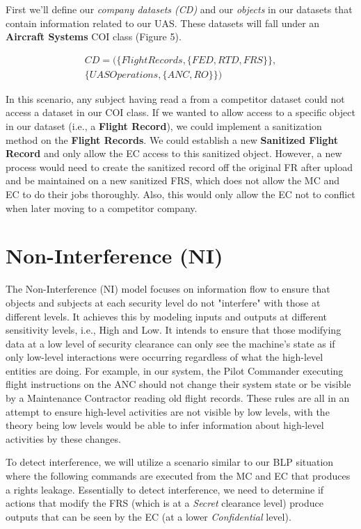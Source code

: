 \documentclass[10pt,journal,compsoc]{IEEEtran}
\begin{document}
First we'll define our \textit{company datasets (CD)} and our \textit{objects} in our datasets that contain information related to our UAS. These datasets will fall under an \textbf{Aircraft Systems} COI class (Figure 5).

\begin{equation*}
  \begin{aligned}
    CD = (\{Flight Records, \{FED, RTD, FRS\}\},\\
         \{UAS Operations, \{ANC, RO\}\})
  \end{aligned}
\end{equation*}

In this scenario, any subject having read a from a competitor dataset could not access a dataset in our COI class. If we wanted to allow access to a specific object in our dataset (i.e., a \textbf{Flight Record}), we could implement a sanitization method on the \textbf{Flight Records}. We could establish a new \textbf{Sanitized Flight Record} and only allow the EC access to this sanitized object. However, a new process would need to create the sanitized record off the original FR after upload and be maintained on a new sanitized FRS, which does not allow the MC and EC to do their jobs thoroughly. Also, this would only allow the EC not to conflict when later moving to a competitor company. 

\section{Non-Interference (NI)}

The Non-Interference (NI) model focuses on information flow to ensure that objects and subjects at each security level do not "interfere" with those at different levels. It achieves this by modeling inputs and outputs at different sensitivity levels, i.e., High and Low. It intends to ensure that those modifying data at a low level of security clearance can only see the machine's state as if only low-level interactions were occurring regardless of what the high-level entities are doing. For example, in our system, the Pilot Commander executing flight instructions on the ANC should not change their system state or be visible by a Maintenance Contractor reading old flight records. These rules are all in an attempt to ensure high-level activities are not visible by low levels, with the theory being low levels would be able to infer information about high-level activities by these changes.

To detect interference, we will utilize a scenario similar to our BLP situation where the following commands are executed from the MC and EC that produces a rights leakage. Essentially to detect interference, we need to determine if actions that modify the FRS (which is at a \textit{Secret} clearance level) produce outputs that can be seen by the EC (at a lower \textit{Confidential} level).
\end{document}
